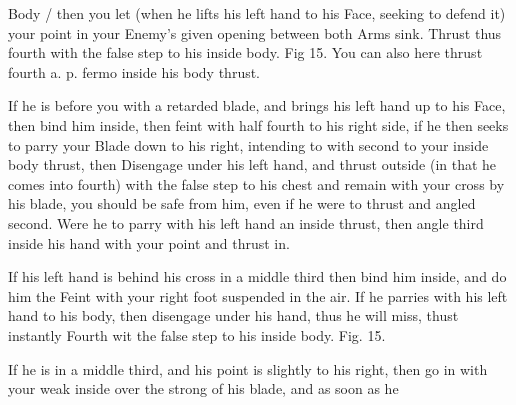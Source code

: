 \newpage


\newpage


Body / then you let (when he lifts his left hand to his Face, seeking
to defend it) your point in your Enemy's given opening between both
Arms sink. Thrust thus fourth with the false step to his inside
body. Fig 15. You can also here thrust fourth a. p. fermo inside his
body thrust.

\exercise{}
If he is before you with a retarded blade, and brings his left hand up
to his Face, then bind him inside, then feint with half fourth to his
right side, if he then seeks to parry your Blade down to his right,
intending to with second to your inside body thrust, then Disengage
under his left hand, and thrust outside (in that he comes into fourth)
with the false step to his chest and remain with your cross by his
blade, you should be safe from him, even if he were to thrust and
angled second. Were he to parry with his left hand an inside thrust,
then angle third inside his hand with your point and thrust in.


\exercise{}
If his left hand is behind his cross in a middle third then bind him
inside, and do him the Feint with your right foot suspended in the
air. If he parries with his left hand to his body, then disengage
under his hand, thus he will miss, thust instantly Fourth wit the
false step to his inside body. Fig. 15.

\exercise{}
If he is in a middle third, and his point is slightly to his right,
then go in with your weak inside over the strong of his blade, and as
soon as he
